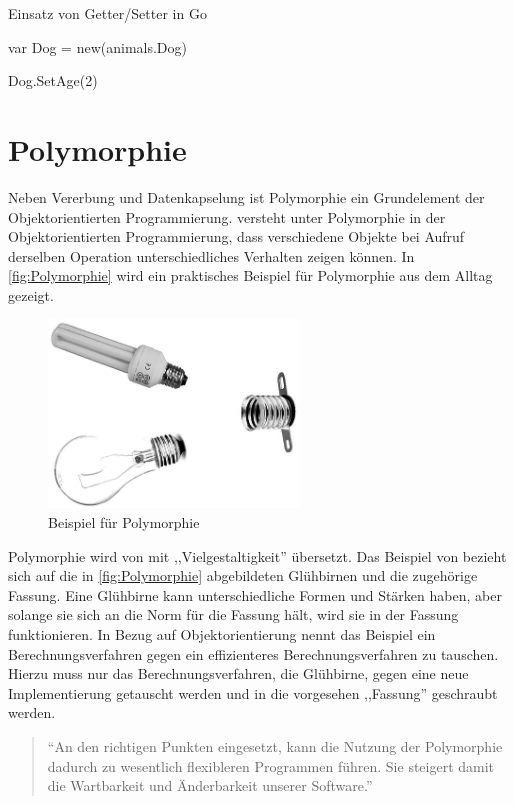 \begin{listing}
\caption{Einsatz von Getter/Setter in Go}
\label{lst:GetterSetterGo}
\begin{GoCode}
var Dog = new(animals.Dog)

Dog.SetAge(2)
\end{GoCode}
\end{listing}

\section{Polymorphie}
Neben Vererbung und Datenkapselung ist Polymorphie ein Grundelement der Objektorientierten Programmierung.
\cite[]{Lahres.2011} versteht unter Polymorphie in der Objektorientierten Programmierung, dass verschiedene Objekte bei Aufruf derselben Operation unterschiedliches Verhalten zeigen können. 
In \autoref{fig:Polymorphie} wird ein praktisches Beispiel für Polymorphie aus dem Alltag gezeigt. 

\begin{figure}[H]
    \centering
    \includegraphics[height=5cm]{Images/Polymorphie}
    \caption{Beispiel für Polymorphie \cite[]{Lahres.2011}}
    \label{fig:Polymorphie}
\end{figure}

Polymorphie wird von \cite[]{Lahres.2011} mit ,,Vielgestaltigkeit'' übersetzt. Das Beispiel von \cite[]{Lahres.2011} bezieht sich auf die in \autoref{fig:Polymorphie} abgebildeten Glühbirnen und die zugehörige Fassung. 
Eine Glühbirne kann unterschiedliche Formen und Stärken haben, aber solange sie sich an die Norm für die Fassung hält, wird sie in der Fassung funktionieren. 
In Bezug auf Objektorientierung nennt \cite[]{Lahres.2011} das Beispiel ein Berechnungsverfahren gegen ein effizienteres Berechnungsverfahren zu tauschen. 
Hierzu muss nur das Berechnungsverfahren, die Glühbirne, gegen eine neue Implementierung getauscht werden und in die vorgesehen ,,Fassung'' geschraubt werden.

\begin{quote}
\enquote{An den richtigen Punkten eingesetzt, kann die Nutzung der Polymorphie dadurch zu wesentlich flexibleren Programmen führen. Sie steigert damit die Wartbarkeit und Änderbarkeit unserer Software.}
\cite[]{Lahres.2011}
\end{quote}

